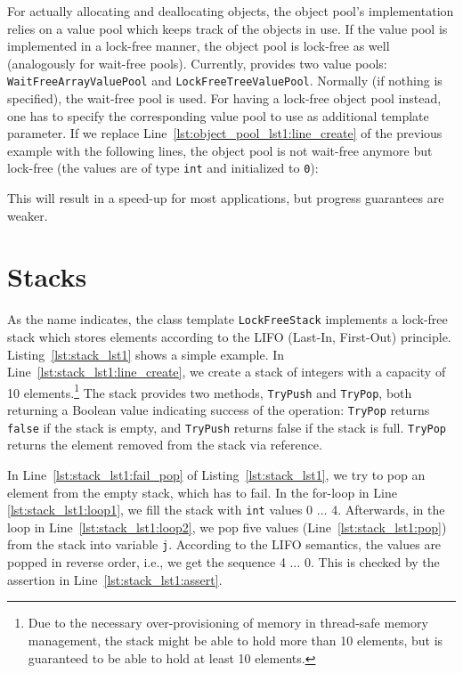 

For actually allocating and deallocating objects, the object pool's implementation relies on a value pool which keeps track of the objects in use. If the value pool is implemented in a lock-free manner, the object pool is lock-free as well (analogously for wait-free pools). Currently, \embb provides two value pools: \lstinline|WaitFreeArrayValuePool| and \lstinline|LockFreeTreeValuePool|. Normally (if nothing is specified), the wait-free pool is used. For having a lock-free object pool instead, one has to specify the corresponding value pool to use as additional template parameter. If we replace Line~\ref{lst:object_pool_lst1:line_create} of the previous example with the following lines, the object pool is not wait-free anymore but lock-free (the values are of type
\lstinline|int| and initialized to \lstinline|0|):
%

%
This will result in a speed-up for most applications, but progress guarantees are weaker.

\section{Stacks}
\label{sec:containers_stacks}

As the name indicates, the class template \lstinline|LockFreeStack| implements a lock-free stack which stores elements according to the LIFO (Last-In, First-Out) principle. Listing~\ref{lst:stack_lst1} shows a simple example. In Line~\ref{lst:stack_lst1:line_create}, we create a stack of integers with a capacity of 10 elements.\footnote{Due to the necessary over-provisioning of memory in thread-safe memory management, the stack might be able to hold more than 10 elements, but is guaranteed to be able to hold at least 10 elements.} The stack provides two methods, \lstinline|TryPush| and \lstinline|TryPop|, both returning a Boolean value indicating success of the operation: \lstinline|TryPop| returns \lstinline|false| if the stack is empty, and \lstinline|TryPush| returns false if the stack is full. \lstinline|TryPop| returns the element removed from the stack via reference.



In Line~\ref{lst:stack_lst1:fail_pop} of Listing~\ref{lst:stack_lst1}, we try to pop an element from the empty stack, which has to fail. In the for-loop in Line \ref{lst:stack_lst1:loop1}, we fill the stack with \lstinline|int| values 0 $\ldots$ 4. Afterwards, in the loop in Line~\ref{lst:stack_lst1:loop2}, we pop five values (Line~\ref{lst:stack_lst1:pop}) from the stack into variable \lstinline|j|. According to the LIFO semantics, the values are popped in reverse order, i.e., we get the sequence 4 $\ldots$ 0. This is checked by the assertion in Line~\ref{lst:stack_lst1:assert}.


